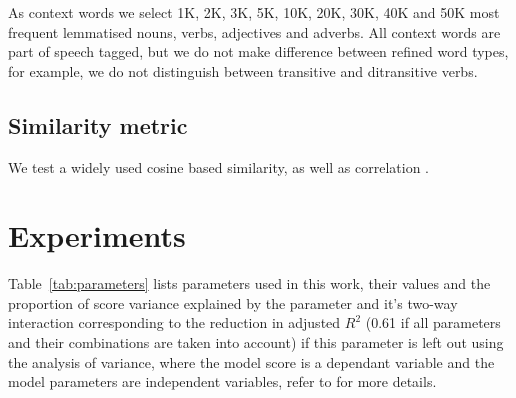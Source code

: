 \documentclass[11pt,letterpaper]{article}
\begin{document}
As context words we select 1K, 2K, 3K, 5K, 10K, 20K, 30K, 40K and 50K most frequent lemmatised nouns, verbs, adjectives and adverbs. All context words are part of speech tagged, but we do not make difference between refined word types, for example, we do not distinguish between transitive and ditransitive verbs.

\subsection{Similarity metric}
\label{sec:similarity-metric}

We test a widely used cosine based similarity, as well as correlation \cite{kiela-clark:2014:CVSC}.

\section{Experiments}
\label{sec:lexical-experiments}



Table~\ref{tab:parameters} lists parameters used in this work, their values and the proportion of score variance explained by the parameter and it's two-way interaction corresponding to the reduction in adjusted $R^2$ (0.61 if all parameters and their combinations are taken into account) if this parameter is left out using the analysis of variance, where the model score is a dependant variable and the model parameters are independent variables, refer to  for more details.





\end{document}

